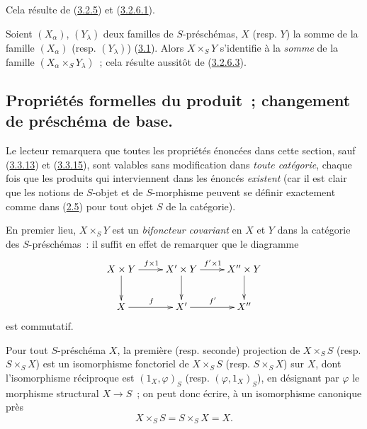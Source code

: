 Cela résulte de (\hyperref[I.3.2.5-fr]{3.2.5}) et
(\hyperref[I.3.2.6.1-fr]{3.2.6.1}).

\begin{env}[3.2.8]
\label{I.3.2.8-fr}
Soient $(X_\alpha)$, $(Y_\lambda)$ deux familles de $S$-préschémas, $X$
(resp. $Y$) la somme de la famille $(X_\alpha)$ (resp. $(Y_\lambda)$)
(\hyperref[subsection:I.3.1-fr]{3.1}). Alors $X\times_S Y$ s'identifie à la
\emph{somme} de la famille $(X_\alpha\times_S Y_\lambda)$~; cela résulte
aussitôt de (\hyperref[I.3.2.6.3-fr]{3.2.6.3}).
\end{env}

\subsection{Propriétés formelles du produit~; changement de préschéma de base.}
\label{subsection:I.3.3-fr}

\begin{env}[3.3.1]
\label{I.3.3.1-fr}
Le lecteur remarquera que toutes les propriétés énoncées dans cette section,
sauf (\hyperref[I.3.3.13-fr]{3.3.13}) et
(\hyperref[I.3.3.15-fr]{3.3.15}), sont valables sans modification dans
\emph{toute catégorie}, chaque fois que les produits qui interviennent dans
les énoncés \emph{existent} (car il est clair que les notions de $S$-objet et
de $S$-morphisme peuvent se définir exactement comme dans
(\hyperref[subsection:I.2.5-fr]{2.5}) pour tout objet $S$ de la catégorie).
\end{env}

\begin{env}[3.3.2]
\label{I.3.3.2-fr}
En premier lieu, $X\times_S Y$ est un \emph{bifoncteur covariant} en $X$ et
$Y$ dans la catégorie des $S$-préschémas~: il suffit en effet de remarquer
que le diagramme
\[
  \xymatrix{
    X\times Y\ar[r]^{f\times 1}\ar[d] &
    X'\times Y\ar[r]^{f'\times 1}\ar[d] &
    X''\times Y\ar[d]\\
    X\ar[r]^f & X'\ar[r]^{f'} & X''
  }
\]
est commutatif.
\end{env}

\begin{proposition}[3.3.3]
\label{I.3.3.3-fr}
Pour tout $S$-préschéma $X$, la première (resp. seconde) projection de
$X\times_S S$ (resp. $S\times_S X$) est un isomorphisme fonctoriel de
$X\times_S S$ (resp. $S\times_S X$) sur $X$, dont l'isomorphisme réciproque
est $(1_X,\varphi)_S$ (resp. $(\varphi,1_X)_S$), en désignant par $\varphi$
le morphisme structural $X\to S$~; on peut donc écrire, à un isomorphisme
canonique près
\[
  X\times_S S=S\times_S X=X.
\]
\end{proposition}

